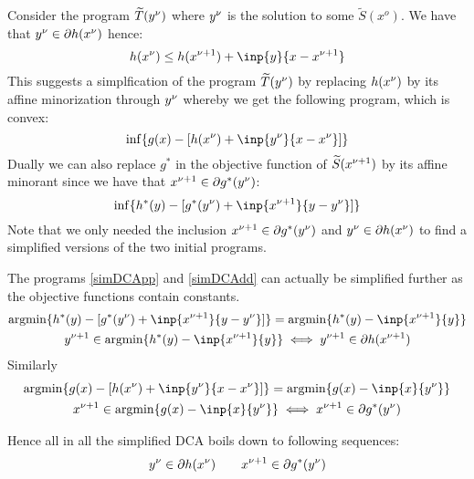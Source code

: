 Consider the program $\widetilde T(y^{\nu})$ where $y^{\nu}$ is the solution
to some $\widetilde S(x^o)$. We have that $y^{\nu}\in\partial h(x^\nu)$ hence:
\begin{equation}
    h(\xs)\leq h(\xss) + \inp{y}{x-\xss} 
\end{equation}
This suggests a simplfication of the program $\widetilde T(y^{\nu})$ by replacing
$h(x^\nu)$ by its affine minorization through $y^{\nu}$ whereby we get the
following program, which is convex: 
\begin{equation}
    \inf\{g(x) - [h(\xs)+\inp{\ys}{x-\xs}] \}
    \label{simDCApp}
\end{equation}
Dually we can also replace $g^*$ in the objective function
of $\widetilde S(x^{\nu+1})$ by its affine minorant since we have that
$x^{\nu+1} \in \partial g^*(y^{\nu})$:
\begin{equation}
    \inf\{h^*(y)-[g^*(\ys) + \inp{\xss}{y-\ys}]\}
    \label{simDCAdd}
\end{equation}
Note that we only needed the inclusion $x^{\nu+1}\in\partial g^*(y^{\nu})$
and $y^{\nu}\in\partial h(x^\nu)$ to find a simplified versions of
the two initial programs.\\
\begin{comment}
Note that the simplified forms \eqref{simDCApp} and \eqref{simDCAdd}
are actually equivalent to the programs from \eqref{fulldca} if the functions 
$g^*$ and $h$ are actually essentially differentiable \autocite{tao2005dc}.
\end{comment}
\newpage
%
The programs \eqref{simDCApp} and \eqref{simDCAdd} can actually be simplified
further as the objective functions contain constants.
%
\begin{gather}
   \argmin\{h^*(y)-[g^*(\ys) + \inp{\xss}{y-\ys}]\}=
   \argmin\{h^*(y) -\inp{\xss}{y}\}\\
  \yss \in \argmin\{h^*(y) -\inp{\xss}{y}\} \iff \yss \in \partial h(\xss)
\end{gather}
Similarly
\begin{gather}
    \argmin\{g(x) - [h(\xs)+\inp{\ys}{x-\xs}] \}=
   \argmin\{g(x) -\inp{x}{\ys}\}\\
	\xss \in   \argmin\{g(x) -\inp{x}{\ys}\} \iff \xss \in \partial g^*(\ys)
\end{gather}

Hence all in all the simplified DCA boils down to following sequences:
\begin{equation}
	y^{\nu}\in\partial h(x^\nu) \qquad x^{\nu+1}\in\partial g^*(y^{\nu})
\end{equation}
\newpage

